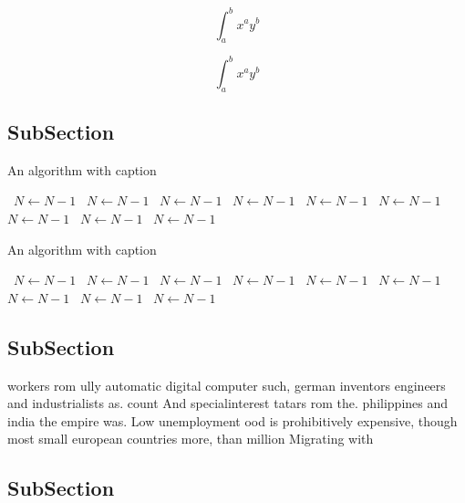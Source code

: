 \documentclass[a4paper]{article}
\begin{document}
\[ \int_{a}^{b}{x^{a}y^{b}} \]

\[ \int_{a}^{b}{x^{a}y^{b}} \]

\subsection{SubSection}

\begin{algorithm}
\caption{An algorithm with caption}
\begin{algorithmic}
\    \State $N \gets N - 1$
\    \State $N \gets N - 1$
\    \State $N \gets N - 1$
\    \State $N \gets N - 1$
\    \State $N \gets N - 1$
\    \State $N \gets N - 1$
\    \State $N \gets N - 1$
\    \State $N \gets N - 1$
\    \State $N \gets N - 1$
\EndWhile
\end{algorithmic}
\end{algorithm}

\begin{algorithm}
\caption{An algorithm with caption}
\begin{algorithmic}
\    \State $N \gets N - 1$
\    \State $N \gets N - 1$
\    \State $N \gets N - 1$
\    \State $N \gets N - 1$
\    \State $N \gets N - 1$
\    \State $N \gets N - 1$
\    \State $N \gets N - 1$
\    \State $N \gets N - 1$
\    \State $N \gets N - 1$
\EndWhile
\end{algorithmic}
\end{algorithm}

\subsection{SubSection}

workers rom ully automatic digital computer such, german inventors engineers and industrialists as. count And specialinterest tatars rom the. philippines and india the empire was. Low unemployment ood is prohibitively expensive, though most small european countries more, than million Migrating with

\subsection{SubSection}
\end{document}
